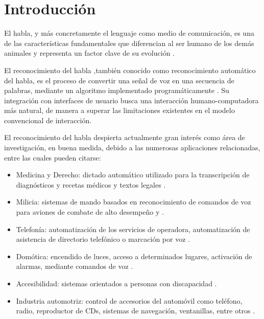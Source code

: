 \section{Introducci\'{o}n}
\label{sec:intro}

El habla, y m\'{a}s concretamente el lenguaje como medio de comunicaci\'{o}n, es una de las 
caracter\'{i}sticas fundamentales 
que diferencian al ser humano de los dem\'{a}s animales y representa un factor clave de su evoluci\'{o}n \cite{SchepartzLanguage1993}. 

El reconocimiento del habla ,tambi\'{e}n conocido como reconocimiento autom\'{a}tico del habla,
es el proceso de convertir
una se\~{n}al de voz en una secuencia de palabras, mediante un algoritmo implementado 
programáticamente \cite{JaisalAReview2012}. Su integraci\'{o}n con interfaces de usuario busca una interacci\'{o}n 
humano-computadora m\'{a}s natural, de manera a superar las limitaciones existentes 
en el modelo convencional de interacci\'{o}n.

El reconocimiento del habla despierta actualmente gran inter\'{e}s como \'{a}rea de investigaci\'{o}n, 
en buena medida, debido a las numerosas aplicaciones relacionadas, entre las cuales pueden citarse:

\begin{itemize}
    \item Medicina y Derecho: dictado autom\'{a}tico utilizado para la transcripci\'{o}n de 
     diagn\'{o}sticos y recetas m\'{e}dicos y textos legales \cite{GrassoTheLong2003}.

    \item Milicia: sistemas de mando basados en reconocimiento de comandos de voz para aviones 
     de combate de alto desempe\~{n}o \cite{Eurofighter} y \cite{WeinsteinOpportunities1991}.

    \item Telefon\'{i}a: automatizaci\'{o}n de los servicios de operadora, automatizaci\'{o}n de 
     asistencia de directorio telef\'{o}nico o marcaci\'{o}n por voz \cite{RabinerAutomatic1997}.

    \item Dom\'{o}tica: encendido de luces, acceso a determinados lugares, activaci\'{o}n de alarmas, 
     mediante comandos de voz \cite{BellesiReconocimiento2008}.

    \item Accesibilidad: sistemas orientados a personas con discapacidad \cite{MirandaUnJuego2007}.

    \item Industria automotriz: control de accesorios del autom\'{o}vil como tel\'{e}fono, radio, 
     reproductor de CDs, sistemas de navegaci\'{o}n, ventanillas, entre otros \cite{SalaSpeech1999}.
\end{itemize}


